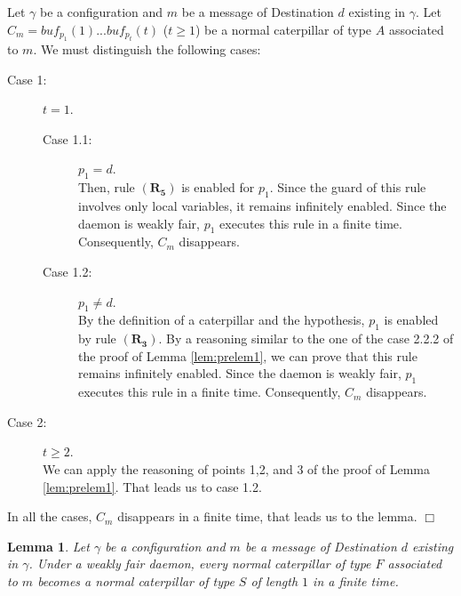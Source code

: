 \documentclass[11pt]{article}
\newtheorem{lemma}{Lemma}
\newenvironment{proof}{{\noindent\bf Proof. } }{{\hfill $\Box$}}
\begin{document}
\begin{proof}
Let $\gamma$ be a configuration and $m$ be a message of Destination $d$ existing in $\gamma$. Let $C_{m}=buf_{p_{1}}(1)...buf_{p_{t}}(t)$ ($t\geq1$) be a normal caterpillar of type $A$ associated to $m$. We must distinguish the following cases:

\begin{description}
\item [Case 1:] $t=1$.

\begin{description}
\item [Case 1.1:] $p_{1}=d$.\\
Then, rule $\boldsymbol{(R_{5})}$ is enabled for $p_{1}$. Since the guard of this rule involves only local variables, it remains infinitely enabled. Since the daemon is weakly fair, $p_{1}$ executes this rule in a finite time. Consequently, $C_{m}$ disappears.
\item [Case 1.2:] $p_{1}\neq d$.\\
By the definition of a caterpillar and the hypothesis, $p_{1}$ is enabled by rule $\boldsymbol{(R_{3})}$. By a reasoning similar to the one of the case 2.2.2 of the proof of Lemma \ref{lem:prelem1}, we can prove that this rule remains infinitely enabled. Since the daemon is weakly fair, $p_{1}$ executes this rule in a finite time. Consequently, $C_{m}$ disappears.
\end{description}

\item [Case 2:] $t\geq2$.\\
We can apply the reasoning of points 1,2, and 3 of the proof of Lemma \ref{lem:prelem1}. That leads us to case 1.2. 
\end{description}

In all the cases, $C_{m}$ disappears in a finite time, that leads us to the lemma.
\end{proof}

\begin{lemma} \label{lem:prelem3}
Let $\gamma$ be a configuration and $m$ be a message of Destination $d$ existing in $\gamma$. Under a weakly fair daemon, every normal caterpillar of type $F$ associated to $m$ becomes a normal caterpillar of type $S$ of length $1$ in a finite time.
\end{lemma}
\end{document}
